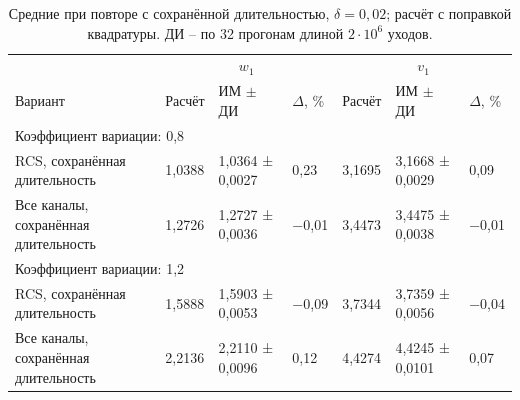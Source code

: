 \begin{table}[!htbp]
\centering\small\setlength{\tabcolsep}{2pt}
\begin{tabular}{@{}p{4.16cm}p{1.61cm}p{2.83cm}p{1.28cm}p{1.61cm}p{2.83cm}p{1.28cm}@{}}
\toprule
 & \multicolumn{3}{c}{$w_1$} & \multicolumn{3}{c}{$v_1$} \\
Вариант & Расчёт & ИМ $\pm$ ДИ & $\Delta$, \% & Расчёт & ИМ $\pm$ ДИ & $\Delta$, \% \\
\midrule
\multicolumn{7}{l}{Коэффициент вариации: 0,8} \\
RCS, сохранённая длительность & 1,0388 & 1,0364 ± 0,0027 & 0,23 & 3,1695 & 3,1668 ± 0,0029 & 0,09 \\
Все каналы, сохранённая длительность & 1,2726 & 1,2727 ± 0,0036 & −0,01 & 3,4473 & 3,4475 ± 0,0038 & −0,01 \\
\multicolumn{7}{l}{Коэффициент вариации: 1,2} \\
RCS, сохранённая длительность & 1,5888 & 1,5903 ± 0,0053 & −0,09 & 3,7344 & 3,7359 ± 0,0056 & −0,04 \\
Все каналы, сохранённая длительность & 2,2136 & 2,2110 ± 0,0096 & 0,12 & 4,4274 & 4,4245 ± 0,0101 & 0,07 \\
\bottomrule
\end{tabular}
\caption{Средние при повторе с сохранённой длительностью, $\delta=0{,}02$; расчёт с поправкой квадратуры. ДИ -- по 32 прогонам длиной $2\cdot10^6$ уходов.}
\label{tab:results_fixed}
\end{table}


